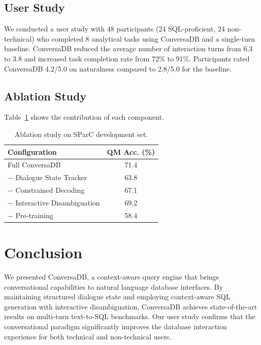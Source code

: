\documentclass[sigconf,nonacm]{acmart}
\begin{document}
\subsection{User Study}

We conducted a user study with 48 participants (24 SQL-proficient, 24 non-technical) who completed 8 analytical tasks using ConversaDB and a single-turn baseline. ConversaDB reduced the average number of interaction turns from 6.3 to 3.8 and increased task completion rate from 72\% to 91\%. Participants rated ConversaDB 4.2/5.0 on naturalness compared to 2.8/5.0 for the baseline.

\subsection{Ablation Study}

Table~\ref{tab:ablation} shows the contribution of each component.

\begin{table}[t]
\caption{Ablation study on SParC development set.}
\label{tab:ablation}
\begin{tabular}{@{}lc@{}}
\toprule
\textbf{Configuration} & \textbf{QM Acc. (\%)} \\
\midrule
Full ConversaDB                    & 71.4 \\
$-$ Dialogue State Tracker         & 63.8 \\
$-$ Constrained Decoding           & 67.1 \\
$-$ Interactive Disambiguation     & 69.2 \\
$-$ Pre-training                   & 58.4 \\
\bottomrule
\end{tabular}
\end{table}

\section{Conclusion}

We presented ConversaDB, a context-aware query engine that brings conversational capabilities to natural language database interfaces. By maintaining structured dialogue state and employing context-aware SQL generation with interactive disambiguation, ConversaDB achieves state-of-the-art results on multi-turn text-to-SQL benchmarks. Our user study confirms that the conversational paradigm significantly improves the database interaction experience for both technical and non-technical users.
\end{document}
